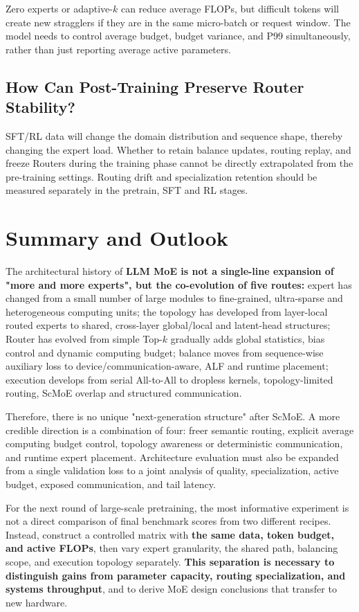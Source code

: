 \documentclass[10pt,a4paper,fontset=none]{ctexart}
\newcommand{\term}[1]{\textbf{#1}}
\begin{document}
Zero experts or adaptive-$k$ can reduce average FLOPs, but difficult tokens will create new stragglers if they are in the same micro-batch or request window. The model needs to control average budget, budget variance, and P99 simultaneously, rather than just reporting average active parameters.

\subsection{How Can Post-Training Preserve Router Stability?}

SFT/RL data will change the domain distribution and sequence shape, thereby changing the expert load. Whether to retain balance updates, routing replay, and freeze Routers during the training phase cannot be directly extrapolated from the pre-training settings. Routing drift and specialization retention should be measured separately in the pretrain, SFT and RL stages.

\section{Summary and Outlook}

The architectural history of \term{LLM MoE is not a single-line expansion of "more and more experts", but the co-evolution of five routes: }expert has changed from a small number of large modules to fine-grained, ultra-sparse and heterogeneous computing units; the topology has developed from layer-local routed experts to shared, cross-layer global/local and latent-head structures; Router has evolved from simple Top-$k$ gradually adds global statistics, bias control and dynamic computing budget; balance moves from sequence-wise auxiliary loss to device/communication-aware, ALF and runtime placement; execution develops from serial All-to-All to dropless kernels, topology-limited routing, ScMoE overlap and structured communication.

Therefore, there is no unique "next-generation structure" after ScMoE. A more credible direction is a combination of four: freer semantic routing, explicit average computing budget control, topology awareness or deterministic communication, and runtime expert placement. Architecture evaluation must also be expanded from a single validation loss to a joint analysis of quality, specialization, active budget, exposed communication, and tail latency.

For the next round of large-scale pretraining, the most informative experiment is not a direct comparison of final benchmark scores from two different recipes. Instead, construct a controlled matrix with \textbf{the same data, token budget, and active FLOPs}, then vary expert granularity, the shared path, balancing scope, and execution topology separately. \textbf{This separation is necessary to distinguish gains from parameter capacity, routing specialization, and systems throughput}, and to derive MoE design conclusions that transfer to new hardware.
\end{document}
